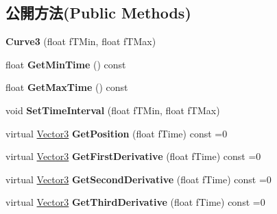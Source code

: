 \subsection*{公開方法(Public Methods)}
\begin{DoxyCompactItemize}
\item 
{\bfseries Curve3} (float f\+T\+Min, float f\+T\+Max)\hypertarget{class_i_dream_sky_1_1_curve3_acb3ef0c25d10b3d32572ea00a1bbd503}{}\label{class_i_dream_sky_1_1_curve3_acb3ef0c25d10b3d32572ea00a1bbd503}

\item 
float {\bfseries Get\+Min\+Time} () const \hypertarget{class_i_dream_sky_1_1_curve3_a429d0cde62bc21550b82bfc6b37c0fa1}{}\label{class_i_dream_sky_1_1_curve3_a429d0cde62bc21550b82bfc6b37c0fa1}

\item 
float {\bfseries Get\+Max\+Time} () const \hypertarget{class_i_dream_sky_1_1_curve3_ac3c43e684b26aae7ce3b2664ea34e121}{}\label{class_i_dream_sky_1_1_curve3_ac3c43e684b26aae7ce3b2664ea34e121}

\item 
void {\bfseries Set\+Time\+Interval} (float f\+T\+Min, float f\+T\+Max)\hypertarget{class_i_dream_sky_1_1_curve3_ab7034bc264e51f71e579e204ba5acbcf}{}\label{class_i_dream_sky_1_1_curve3_ab7034bc264e51f71e579e204ba5acbcf}

\item 
virtual \hyperlink{class_i_dream_sky_1_1_vector3}{Vector3} {\bfseries Get\+Position} (float f\+Time) const  =0\hypertarget{class_i_dream_sky_1_1_curve3_a3a87642ce8c75ad9ee49323da85aa7e2}{}\label{class_i_dream_sky_1_1_curve3_a3a87642ce8c75ad9ee49323da85aa7e2}

\item 
virtual \hyperlink{class_i_dream_sky_1_1_vector3}{Vector3} {\bfseries Get\+First\+Derivative} (float f\+Time) const  =0\hypertarget{class_i_dream_sky_1_1_curve3_a9b18e63be4081ddfc743ed8f6167bae8}{}\label{class_i_dream_sky_1_1_curve3_a9b18e63be4081ddfc743ed8f6167bae8}

\item 
virtual \hyperlink{class_i_dream_sky_1_1_vector3}{Vector3} {\bfseries Get\+Second\+Derivative} (float f\+Time) const  =0\hypertarget{class_i_dream_sky_1_1_curve3_a891b4a2b327a6fe5e3eae2946bff0059}{}\label{class_i_dream_sky_1_1_curve3_a891b4a2b327a6fe5e3eae2946bff0059}

\item 
virtual \hyperlink{class_i_dream_sky_1_1_vector3}{Vector3} {\bfseries Get\+Third\+Derivative} (float f\+Time) const  =0\hypertarget{class_i_dream_sky_1_1_curve3_affb274e2ca97f3fa8b77ba014be4071b}{}\label{class_i_dream_sky_1_1_curve3_affb274e2ca97f3fa8b77ba014be4071b}


\end{DoxyCompactItemize}
